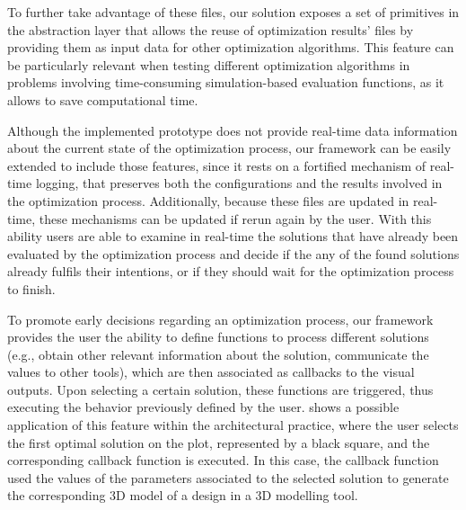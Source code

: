 To further take advantage of these files, our solution exposes a set of primitives in the abstraction layer that allows the reuse of optimization results' files by providing them as input data for other optimization algorithms. This feature can be particularly relevant when testing different optimization algorithms in problems involving time-consuming simulation-based evaluation functions, as it allows to save computational time.


Although the implemented prototype does not provide real-time data information about the current state of the optimization process, our framework can be easily extended to include those features, since it rests on a fortified mechanism of real-time logging, that preserves both the configurations and the results involved in the optimization process. Additionally, because these files are updated in real-time, these mechanisms can be updated if rerun again by the user. With this ability users are able to examine in real-time the solutions that have already been evaluated by the optimization process and decide if the any of the found solutions already fulfils their intentions, or if they should wait for the optimization process to finish. 

To promote early decisions regarding an optimization process, our framework provides the user the ability to define functions to process different solutions (e.g., obtain other relevant information about the solution, communicate the values to other tools), which are then associated as callbacks to the visual outputs. Upon selecting a certain solution, these functions are triggered, thus executing the behavior previously defined by the user.  shows a possible application of this feature within the architectural practice, where the user selects the first optimal solution on the plot, represented by a black square, and the corresponding callback function is executed. In this case, the callback function used the values of the parameters associated to the selected solution to generate the corresponding 3D model of a  design in a 3D modelling tool. 

